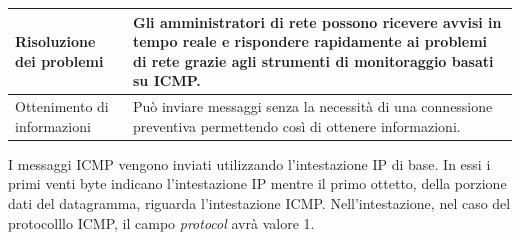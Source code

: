 \begin{center}
\begin{longtable}{|p{}|p{}|}
    \hline
    Risoluzione dei problemi & 
    Gli amministratori di rete possono ricevere avvisi in tempo reale e rispondere rapidamente ai problemi di rete grazie agli strumenti di monitoraggio basati su ICMP.
    \\
    \hline
    Ottenimento di informazioni & 
    Può inviare messaggi senza la necessità di una connessione preventiva permettendo così di ottenere informazioni. %
    \\
    \hline
\end{longtable} 
\end{center} 
I messaggi ICMP vengono inviati utilizzando l'intestazione IP di base. 
In essi i primi venti byte indicano l'intestazione IP mentre il primo ottetto, della porzione dati del datagramma, riguarda l'intestazione ICMP. 
Nell'intestazione, nel caso del protocolllo ICMP, il campo \textit{protocol} avrà valore 1. 
\vspace{3ex}\newline
